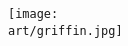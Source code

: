 \begin{multicols}{2}
\end{multicols}

\vspace*{\fill}

\begin{figure*}[!hb]
  \centering
  \texttt{[image: \\art/griffin.jpg]}
\end{figure*}
